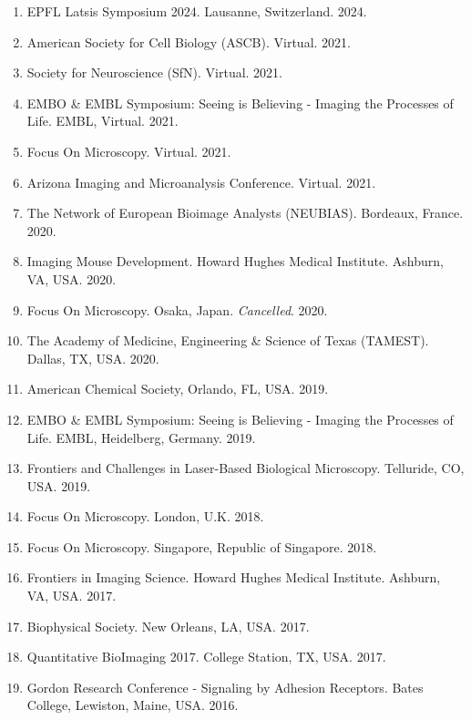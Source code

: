 \begin{enumerate}
\item EPFL Latsis Symposium 2024. Lausanne, Switzerland. 2024.
\item American Society for Cell Biology (ASCB). Virtual. 2021.
\item Society for Neuroscience (SfN). Virtual. 2021.
\item EMBO \& EMBL Symposium: Seeing is Believing - Imaging the Processes of Life.  EMBL, Virtual.  2021.
\item Focus On Microscopy. Virtual. 2021.
\item Arizona Imaging and Microanalysis Conference. Virtual. 2021.
\item The Network of European Bioimage Analysts (NEUBIAS).  Bordeaux, France. 2020.
\item Imaging Mouse Development. Howard Hughes Medical Institute.  Ashburn, VA, USA. 2020.
\item Focus On Microscopy.  Osaka, Japan. {\it Cancelled}. 2020.
\item The Academy of Medicine, Engineering \& Science of Texas (TAMEST).  Dallas, TX, USA. 2020.
\item American Chemical Society, Orlando, FL, USA. 2019.
\item EMBO \& EMBL Symposium: Seeing is Believing - Imaging the Processes of Life.  EMBL, Heidelberg, Germany. 2019.
\item Frontiers and Challenges in Laser-Based Biological Microscopy. Telluride, CO, USA. 2019.
\item Focus On Microscopy.  London, U.K.  2018.
\item Focus On Microscopy.  Singapore, Republic of Singapore. 2018.
\item Frontiers in Imaging Science. Howard Hughes Medical Institute.  Ashburn, VA, USA.  2017.
\item Biophysical Society.  New Orleans, LA, USA. 2017.
\item Quantitative BioImaging 2017.  College Station, TX, USA. 2017.
\item Gordon Research Conference - Signaling by Adhesion Receptors.  Bates College, Lewiston, Maine, USA. 2016.

\end{enumerate}
